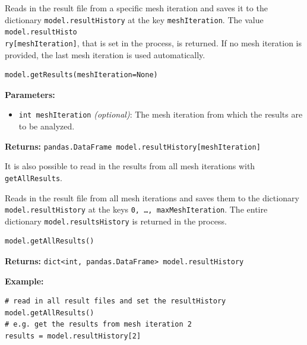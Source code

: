 \documentclass[12pt]{article}
\begin{document}
\begin{mdframed}[backgroundcolor=gray!10, roundcorner=10pt,
		linewidth=1pt]

	Reads in the result file from a specific mesh iteration and saves it to
	the dictionary \texttt{model.resultHistory} at the key \texttt{meshIteration}.
	The value \texttt{model.resultHisto\\ ry[meshIteration]}, that is set in the
	process, is returned. If no mesh iteration is provided, the last mesh iteration
	is used automatically.

	\begin{lstlisting}
model.getResults(meshIteration=None)
		\end{lstlisting}
	\label{getResults}
	\textbf{Parameters:}
	\begin{itemize}
		\item \texttt{int meshIteration} \emph{(optional)}: The mesh
		      iteration from which the results are to be analyzed.
	\end{itemize}

	\textbf{Returns:} \texttt{pandas.DataFrame
		model.resultHistory[meshIteration]}

\end{mdframed}

It is also possible to read in the results from all mesh iterations with
\texttt{getAllResults}.

\begin{mdframed}[backgroundcolor=gray!10, roundcorner=10pt,
		linewidth=1pt]

	Reads in the result file from all mesh iterations and saves them to the
	dictionary \texttt{model.resultHistory} at the keys \texttt{0, \ldots,
		maxMeshIteration}. The entire dictionary \texttt{model.resultsHistory} is
	returned in the process.

	\begin{lstlisting}
model.getAllResults()
		\end{lstlisting}
	\label{getAllResults}

	\textbf{Returns:} \texttt{dict<int, pandas.DataFrame>
		model.resultHistory}

	\textbf{Example:} \begin{lstlisting}
# read in all result files and set the resultHistory
model.getAllResults()
# e.g. get the results from mesh iteration 2
results = model.resultHistory[2]  
	\end{lstlisting}

\end{mdframed}
\end{document}
